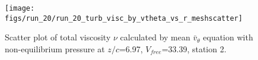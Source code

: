 \begin{figure}[H]
\centering
\texttt{[image: figs/run\_20/run\_20\_turb\_visc\_by\_vtheta\_vs\_r\_meshscatter]}
\caption{Scatter plot of total viscosity $\nu$ calculated by mean $\bar{v}_{\theta}$ equation with non-equilibrium pressure at $z/c$=6.97, $V_{free}$=33.39, station 2.}
\label{fig:run_20_turb_visc_by_vtheta_vs_r_meshscatter}
\end{figure}


